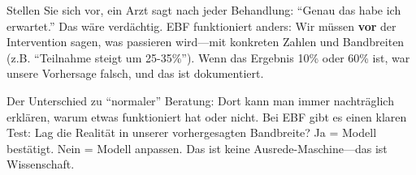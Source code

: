 \begin{tcolorbox}[colback=yellow!5!white, colframe=yellow!75!black,
    title=W1-$\mathcal{P}$-M: Mittel (Praxis)]

Stellen Sie sich vor, ein Arzt sagt nach jeder Behandlung: ``Genau das habe ich erwartet.'' Das wäre verdächtig. EBF funktioniert anders: Wir müssen \textbf{vor} der Intervention sagen, was passieren wird---mit konkreten Zahlen und Bandbreiten (z.B. ``Teilnahme steigt um 25-35\%''). Wenn das Ergebnis 10\% oder 60\% ist, war unsere Vorhersage falsch, und das ist dokumentiert.

Der Unterschied zu ``normaler'' Beratung: Dort kann man immer nachträglich erklären, warum etwas funktioniert hat oder nicht. Bei EBF gibt es einen klaren Test: Lag die Realität in unserer vorhergesagten Bandbreite? Ja = Modell bestätigt. Nein = Modell anpassen. Das ist keine Ausrede-Maschine---das ist Wissenschaft.

\end{tcolorbox}

